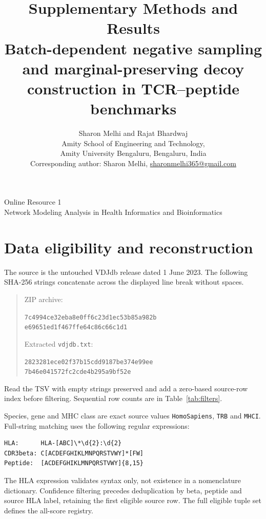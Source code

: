 \documentclass[11pt,a4paper]{article}
\title{Supplementary Methods and Results\\\large Batch-dependent negative sampling and marginal-preserving decoy construction in TCR--peptide benchmarks}
\author{Sharon Melhi and Rajat Bhardwaj\\[3pt]
\small Amity School of Engineering and Technology,\\
\small Amity University Bengaluru, Bengaluru, India\\
\small Corresponding author: Sharon Melhi, \href{mailto:sharonmelhi365@gmail.com}{sharonmelhi365@gmail.com}}
\date{}
\begin{document}
\maketitle
\begin{center}\small Online Resource 1\\Network Modeling Analysis in Health Informatics and Bioinformatics\end{center}
\section{Data eligibility and reconstruction}
The source is the untouched VDJdb release dated 1 June 2023. The following SHA-256 strings concatenate across the displayed line break without spaces.
\begin{quote}\small
ZIP archive:\par\texttt{7c4994ce32eba8e0ff6c23d1ec53b85a982b}\\\texttt{e69651ed1f467ffe64c86c66c1d1}\par
Extracted \texttt{vdjdb.txt}:\par\texttt{2823281ece02f37b15cdd9187be374e99ee}\\\texttt{7b46e041572fc2cde4b295a9bf52e}
\end{quote}
Read the TSV with empty strings preserved and add a zero-based source-row index before filtering. Sequential row counts are in Table~\ref{tab:filters}.
\begin{table}[h]\centering
\caption{Deterministic filtering before confidence selection and tuple deduplication.}\label{tab:filters}

\end{table}
Species, gene and MHC class are exact source values \texttt{HomoSapiens}, \texttt{TRB} and \texttt{MHCI}. Full-string matching uses the following regular expressions:
\begin{verbatim}
HLA:      HLA-[ABC]\*\d{2}:\d{2}
CDR3beta: C[ACDEFGHIKLMNPQRSTVWY]*[FW]
Peptide:  [ACDEFGHIKLMNPQRSTVWY]{8,15}
\end{verbatim}
The HLA expression validates syntax only, not existence in a nomenclature dictionary. Confidence filtering precedes deduplication by beta, peptide and source HLA label, retaining the first eligible source row. The full eligible tuple set defines the all-score registry.
\end{document}
